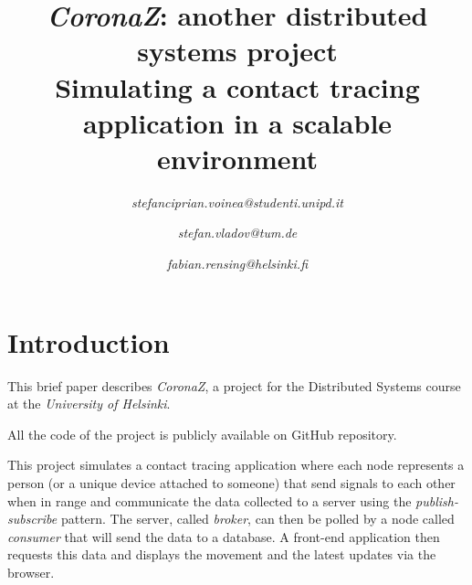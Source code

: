 \documentclass[conference]{IEEEtran}
\begin{document}
\title{\textit{CoronaZ}: another distributed systems project
\\{\Large Simulating a contact tracing application in a scalable environment}
}

\author{
	
	\textit{stefanciprian.voinea@studenti.unipd.it}
	\and
	\textit{stefan.vladov@tum.de}
	\and
	\textit{fabian.rensing@helsinki.fi}
}

\maketitle
\thispagestyle{plain}
\pagestyle{plain}



\section{Introduction}\label{sec:introduction}

	This brief paper describes \textit{CoronaZ}, a project for the Distributed Systems course at the \textit{University of Helsinki}.
	
	All the code of the project is publicly available on GitHub repository\cite{coronaz_repo}.
	
	This project simulates a contact tracing application where each node represents a person (or a unique device attached to someone) that send signals to each other when in range and communicate the data collected to a server using the \textit{publish-subscribe} pattern.
	The server, called \textit{broker}, can then be polled by a node called \textit{consumer} that will send the data to a database.
	A front-end application then requests this data and displays the movement and the latest updates via the browser.
	
\end{document}
